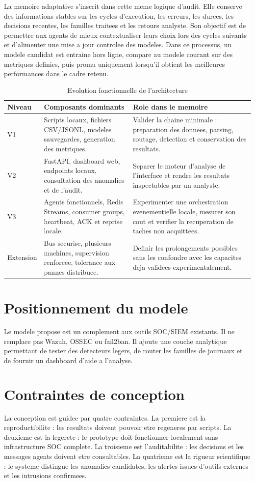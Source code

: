 La memoire adaptative s'inscrit dans cette meme logique d'audit. Elle conserve des informations stables sur les cycles d'execution, les erreurs, les durees, les decisions recentes, les familles traitees et les retours analyste. Son objectif est de permettre aux agents de mieux contextualiser leurs choix lors des cycles suivants et d'alimenter une mise a jour controlee des modeles. Dans ce processus, un modele candidat est entraine hors ligne, compare au modele courant sur des metriques definies, puis promu uniquement lorsqu'il obtient les meilleures performances dans le cadre retenu.

\begin{table}[H]
\centering
\caption{Evolution fonctionnelle de l'architecture}
\label{tab:evolution-architecture}
\scriptsize
\begin{tabularx}{\textwidth}{p{2.2cm}p{4.0cm}X}
\toprule
\textbf{Niveau} & \textbf{Composants dominants} & \textbf{Role dans le memoire} \tabularnewline
\midrule
V1 &
Scripts locaux, fichiers CSV/JSONL, modeles sauvegardes, generation des metriques. &
Valider la chaine minimale : preparation des donnees, parsing, routage, detection et conservation des resultats. \tabularnewline
V2 &
FastAPI, dashboard web, endpoints locaux, consultation des anomalies et de l'audit. &
Separer le moteur d'analyse de l'interface et rendre les resultats inspectables par un analyste. \tabularnewline
V3 &
Agents fonctionnels, Redis Streams, consumer groups, heartbeat, ACK et reprise locale. &
Experimenter une orchestration evenementielle locale, mesurer son cout et verifier la recuperation de taches non acquittees. \tabularnewline
Extension &
Bus securise, plusieurs machines, supervision renforcee, tolerance aux pannes distribuee. &
Definir les prolongements possibles sans les confondre avec les capacites deja validees experimentalement. \tabularnewline
\bottomrule
\end{tabularx}
\end{table}

\section{Positionnement du modele}
Le modele propose est un complement aux outils SOC/SIEM existants. Il ne remplace pas Wazuh, OSSEC ou fail2ban. Il ajoute une couche analytique permettant de tester des detecteurs legers, de router les familles de journaux et de fournir un dashboard d'aide a l'analyse.

\section{Contraintes de conception}
La conception est guidee par quatre contraintes. La premiere est la reproductibilite : les resultats doivent pouvoir etre regeneres par scripts. La deuxieme est la legerete : le prototype doit fonctionner localement sans infrastructure SOC complete. La troisieme est l'auditabilite : les decisions et les messages agents doivent etre consultables. La quatrieme est la rigueur scientifique : le systeme distingue les anomalies candidates, les alertes issues d'outils externes et les intrusions confirmees.

